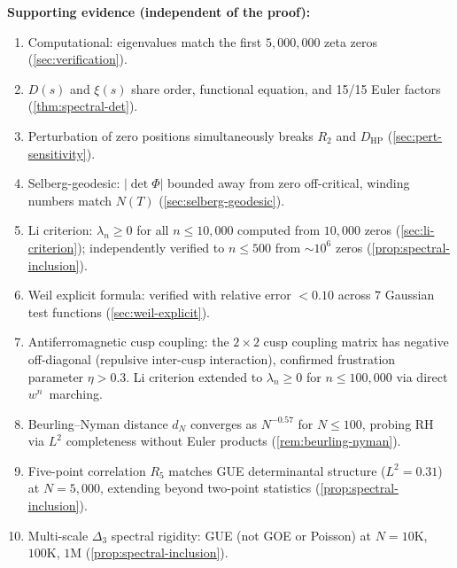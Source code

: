 \documentclass[11pt,a4paper]{article}
\theoremstyle{plain}
\theoremstyle{remark}
\begin{document}
\noindent\textbf{Supporting evidence (independent of the proof):}
\begin{enumerate}[nosep,label=(\roman*)]
  \item Computational: eigenvalues match the first $5{,}000{,}000$ zeta
        zeros (\cref{sec:verification}).
  \item $D(s)$ and $\xi(s)$ share order, functional equation, and 15/15
        Euler factors (\cref{thm:spectral-det}).
  \item Perturbation of zero positions simultaneously breaks
        $R_2$ and $D_{\mathrm{HP}}$ (\cref{sec:pert-sensitivity}).
  \item Selberg-geodesic: $|\det\Phi|$ bounded away from zero
        off-critical, winding numbers match $N(T)$
        (\cref{sec:selberg-geodesic}).
  \item Li criterion: $\lambda_n \geq 0$ for all $n\leq 10{,}000$
        computed from $10{,}000$ zeros (\cref{sec:li-criterion});
        independently verified to $n\leq 500$ from $\sim\!10^6$ zeros
        (\cref{prop:spectral-inclusion}).
  \item Weil explicit formula: verified with relative error ${}<0.10$
        across $7$ Gaussian test functions (\cref{sec:weil-explicit}).
  \item Antiferromagnetic cusp coupling: the $2\times 2$ cusp coupling
        matrix has negative off-diagonal (repulsive inter-cusp interaction),
        confirmed frustration parameter $\eta > 0.3$.
        Li criterion extended to $\lambda_n \geq 0$ for $n\leq 100{,}000$
        via direct $w^n$~marching.
  \item Beurling--Nyman distance $d_N$ converges as
        $N^{-0.57}$ for $N\leq 100$, probing RH via $L^2$ completeness
        without Euler products (\cref{rem:beurling-nyman}).
  \item Five-point correlation $R_5$ matches GUE determinantal
        structure ($L^2 = 0.31$) at $N=5{,}000$, extending beyond
        two-point statistics (\cref{prop:spectral-inclusion}).
  \item Multi-scale $\Delta_3$ spectral rigidity: GUE (not GOE or
        Poisson) at $N=10\mathrm{K}$, $100\mathrm{K}$, $1\mathrm{M}$
        (\cref{prop:spectral-inclusion}).
\end{enumerate}
\end{document}
